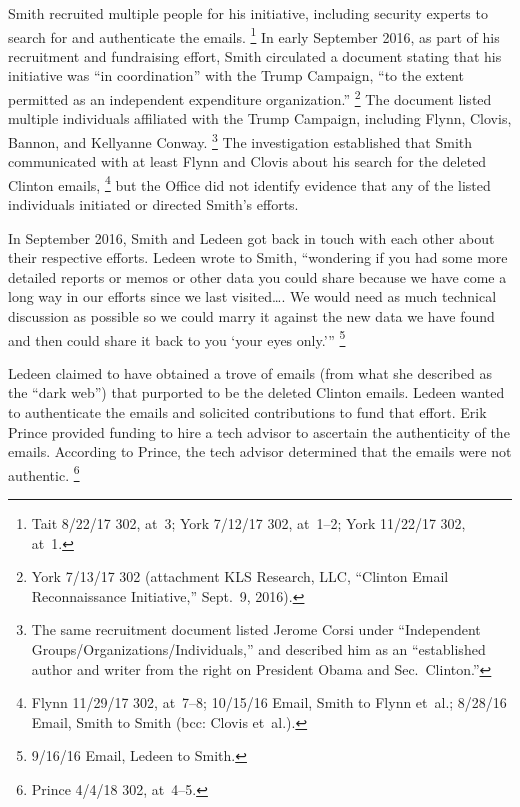 Smith recruited multiple people for his initiative, including security experts to search for and authenticate the emails.%
\footnote{Tait 8/22/17 302, at~3; York 7/12/17 302, at~1--2; York 11/22/17 302, at~1.}
In early September 2016, as part of his recruitment and fundraising effort, Smith circulated a document stating that his initiative was ``in coordination'' with the Trump Campaign, ``to the extent permitted as an independent expenditure organization.''%
\footnote{York 7/13/17 302 (attachment KLS Research, LLC, ``Clinton Email Reconnaissance Initiative,'' Sept.~9, 2016).}
The document listed multiple individuals affiliated with the Trump Campaign, including Flynn, Clovis, Bannon,
and Kellyanne Conway.%
\footnote{The same recruitment document listed Jerome Corsi under ``Independent Groups/Organizations/Individuals,'' and described him as an ``established author and writer from the right on President Obama and Sec.~Clinton.''}
The investigation established that Smith communicated with at least Flynn and Clovis about his search for the deleted Clinton emails,%
\footnote{Flynn 11/29/17 302, at~7--8; 10/15/16 Email, Smith to Flynn et~al.;
8/28/16 Email, Smith to Smith (bcc: Clovis et~al.).}
but the Office did not identify evidence that any of the listed individuals initiated or directed Smith's efforts.

In September 2016, Smith and Ledeen got back in touch with each other about their respective efforts.
Ledeen wrote to Smith, ``wondering if you had some more detailed reports or memos or other data you could share because we have come a long way in our efforts since we last visited\dots.
We would need as much technical discussion as possible so we could marry it against the new data we have found and then could share it back to you `your eyes only.'\thinspace''%
\footnote{9/16/16 Email, Ledeen to Smith.}

Ledeen claimed to have obtained a trove of emails (from what she described as the ``dark web'') that purported to be the deleted Clinton emails.
Ledeen wanted to authenticate the emails and solicited contributions to fund that effort.
Erik Prince provided funding to hire a tech advisor to ascertain the authenticity of the emails.
According to Prince, the tech advisor determined that the emails were not authentic.%
\footnote{Prince 4/4/18 302, at~4--5.}

